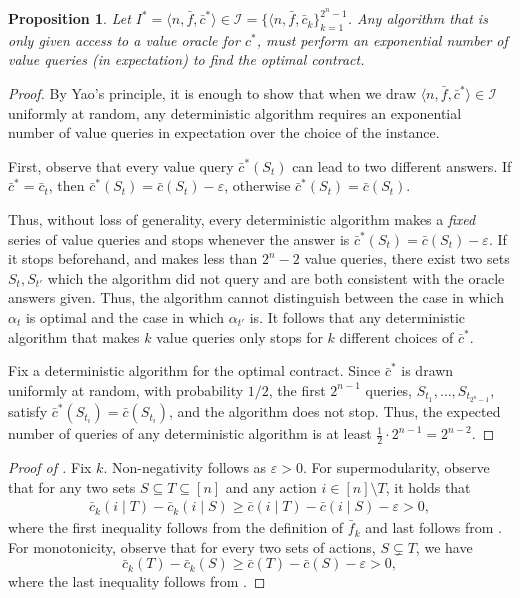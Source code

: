 \documentclass[11pt]{article}
\newtheorem{proposition}{Proposition}
\newcommand{\eps}{\varepsilon}
\newcommand{\I}{\mathcal{I}}
\newcommand{\feq}{\bar{f}}
\newcommand{\ceq}{\bar{c}}
\begin{document}
\begin{proposition}\label{prop:valueQueryBound_SupMod_c}
Let $I^* = \langle n, \feq, \ceq^* \rangle \in \I = \{\langle n, \feq, \ceq_k \}_{k=1}^{2^n-1}$.
Any algorithm that is only given access to a value oracle for $c^*$, must perform an exponential number of value queries (in expectation) to find the optimal contract.
\end{proposition}
\begin{proof}
    By Yao's principle, it is enough to show that when we draw $\langle n, \feq, \ceq^* \rangle \in \I$ uniformly at random, any deterministic algorithm requires an exponential number of value queries in expectation over the choice of the instance.

    First, observe that every value query $\ceq^*(S_t)$ can lead to two different answers. If $\ceq^* = \ceq_{t}$, then $\ceq^*(S_t) = \ceq(S_t) - \eps$, otherwise $\ceq^*(S_t) = \ceq(S_t)$.
    
    Thus, without loss of generality, every deterministic algorithm makes a \emph{fixed} series of value queries and stops whenever the answer is $\ceq^*(S_t) = \ceq(S_t) - \eps$. If it stops beforehand, and makes less than $2^n-2$ value queries, there exist two sets $S_t,S_{t'}$ which the algorithm did not query and are both consistent with the oracle answers given. Thus, the algorithm cannot distinguish between the case in which $\alpha_t$ is optimal and the case in which $\alpha_{t'}$ is.
    It follows that any deterministic algorithm that makes $k$ value queries only stops for $k$ different choices of $\ceq^*$. 
    
    Fix a deterministic algorithm for the optimal contract. Since $\ceq^*$ is drawn uniformly at random, with probability $1/2$, the first $2^{n-1}$ queries, $S_{t_1}, \ldots ,S_{t_{2^{n}-1}}$, satisfy 
    $\ceq^*(S_{t_i}) = \ceq(S_{t_i})$, and the algorithm does not stop.
    Thus, the expected number of queries of any deterministic algorithm is at least $\frac{1}{2} \cdot 2^{n-1} = 2^{n-2}$.
\end{proof}


\begin{proof}[Proof of ]
    Fix $k$. Non-negativity follows as $\eps > 0$. For supermodularity, observe that for any two sets $S \subseteq T \subseteq [n]$ and any action $ i \in [n]\setminus T$, it holds that
    \begin{align*}
    \ceq_k(i \mid T) - \ceq_k(i \mid S) \ge \ceq(i \mid T) - \ceq(i \mid S) - \eps > 0,
    \end{align*}
    where the first inequality follows from the definition of $\feq_k$ and last follows from .
    For monotonicity, observe that for every two sets of actions, $S \subsetneq T$, we have
    $$\ceq_k(T) - \ceq_k(S) \ge \ceq(T) - \ceq(S) - \eps > 0,$$
    where the last inequality follows from .
\end{proof}
\end{document}
